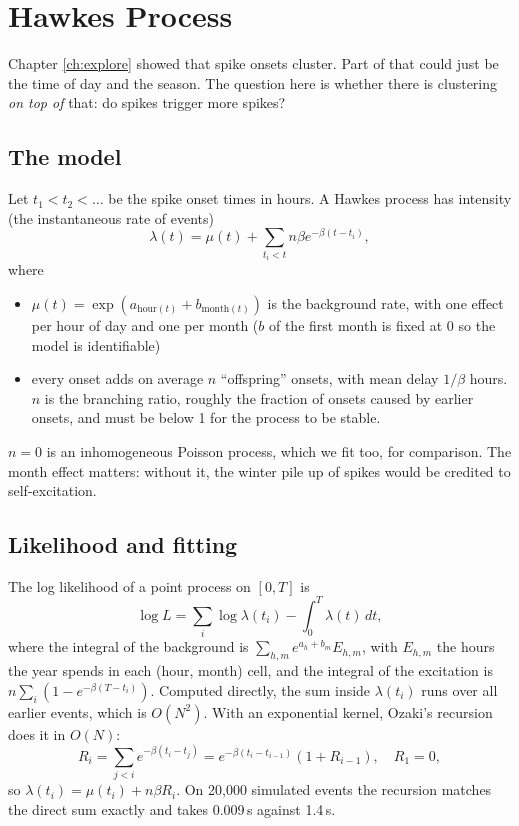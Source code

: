 \chapter{Hawkes Process}\label{ch:hawkes}
Chapter \ref{ch:explore} showed that spike onsets cluster. Part of that could just be the time of day and the season. The
question here is whether there is clustering \emph{on top of} that: do spikes trigger more spikes?

\section{The model}
Let $t_1 < t_2 < \dots$ be the spike onset times in hours. A Hawkes process \cite{hawkes1971} has intensity (the instantaneous rate of events)
\begin{equation}
\lambda(t) = \mu(t) + \sum_{t_i < t} n\beta e^{-\beta(t - t_i)},
\end{equation}
where
\begin{itemize}
\item $\mu(t) = \exp(a_{\text{hour}(t)} + b_{\text{month}(t)})$ is the background rate, with one effect per hour of day and one per
month ($b$ of the first month is fixed at 0 so the model is identifiable)
\item every onset adds on average $n$ ``offspring'' onsets, with mean delay $1/\beta$ hours. $n$ is the branching ratio, roughly the
fraction of onsets caused by earlier onsets, and must be below 1 for the process to be stable.
\end{itemize}
$n = 0$ is an inhomogeneous Poisson process, which we fit too, for comparison. The month effect matters: without it, the winter pile
up of spikes would be credited to self-excitation.

\section{Likelihood and fitting}
The log likelihood of a point process \cite{ogata1978} on $[0, T]$ is 
\begin{equation}
\log L = \sum_i \log \lambda(t_i) - \int_0^T \lambda(t)\,dt,
\end{equation}
where the integral of the background is $\sum_{h,m} e^{a_h + b_m} E_{h,m}$, with $E_{h,m}$ the hours the year spends in each
(hour, month) cell, and the integral of the excitation is $n\sum_i(1 - e^{-\beta(T - t_i)})$. Computed directly, the sum inside
$\lambda(t_i)$ runs over all earlier events, which is $O(N^2)$. With an exponential kernel, Ozaki's recursion \cite{ozaki1979}
does it in $O(N)$:
\begin{equation}
R_i = \sum_{j<i} e^{-\beta(t_i - t_j)} = e^{-\beta(t_i - t_{i-1})}(1 + R_{i-1}), \quad R_1 = 0,
\end{equation}
so $\lambda(t_i) = \mu(t_i) + n\beta R_i$. On 20,000 simulated events the recursion matches the direct sum exactly and takes
0.009\,s against 1.4\,s.

